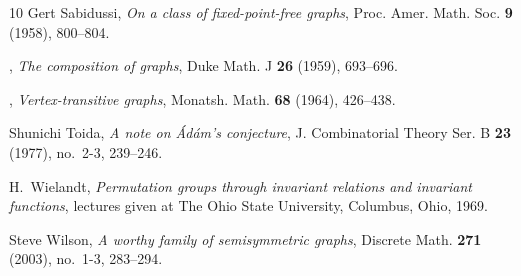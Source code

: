 \documentclass{amsart}
\theoremstyle{definition}
\theoremstyle{remark}
\numberwithin{equation}{section}
\begin{document}
\begin{thebibliography}{10}
Gert Sabidussi, \emph{On a class of fixed-point-free graphs}, Proc. Amer. Math.
  Soc. \textbf{9} (1958), 800--804. 

\bysame, \emph{The composition of graphs}, Duke Math. J \textbf{26} (1959),
  693--696. 

\bysame, \emph{Vertex-transitive graphs}, Monatsh. Math. \textbf{68} (1964),
  426--438. 

Shunichi Toida, \emph{A note on \'{A}d\'am's conjecture}, J. Combinatorial
  Theory Ser. B \textbf{23} (1977), no.~2-3, 239--246. 

H.~Wielandt, \emph{Permutation groups through invariant relations and invariant
  functions}, lectures given at The Ohio State University, Columbus, Ohio,
  1969.

Steve Wilson, \emph{A worthy family of semisymmetric graphs}, Discrete Math.
  \textbf{271} (2003), no.~1-3, 283--294. 

\end{thebibliography}


%
\end{document}
